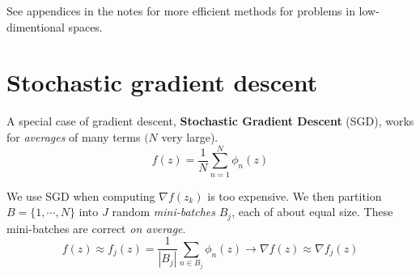 \documentclass[titlepage, 12pt, leqno]{article}
\begin{document}
\begin{note}
    See appendices in the notes for more efficient methods for problems in 
    low-dimentional spaces.
\end{note}

\pagebreak

\section{Stochastic gradient descent}
\begin{definition}
    A special case of gradient descent, \textbf{Stochastic Gradient Descent} 
    (SGD), works for \textit{averages} of many terms $(N$ very large).
    \[
        f(z) = \frac{1}{N}\sum_{n=1}^{N}\phi _{n}(z)
    \]
\end{definition}

We use SGD when computing $\nabla f(z_{k})$ is too expensive. We then partition
$B = \{1, \cdots , N\}$ into $J$ random \textit{mini-batches} $B_{j}$, each of
about equal size. These mini-batches are correct \textit{on average}.
\[
    f(z) \approx f_{j}(z) = \frac{1}{|B_{j}|}\sum_{n \in B_{j}}^{}\phi _{n}(z)
    \rightarrow \nabla f(z) \approx \nabla f_{j}(z)
\]
\end{document}
